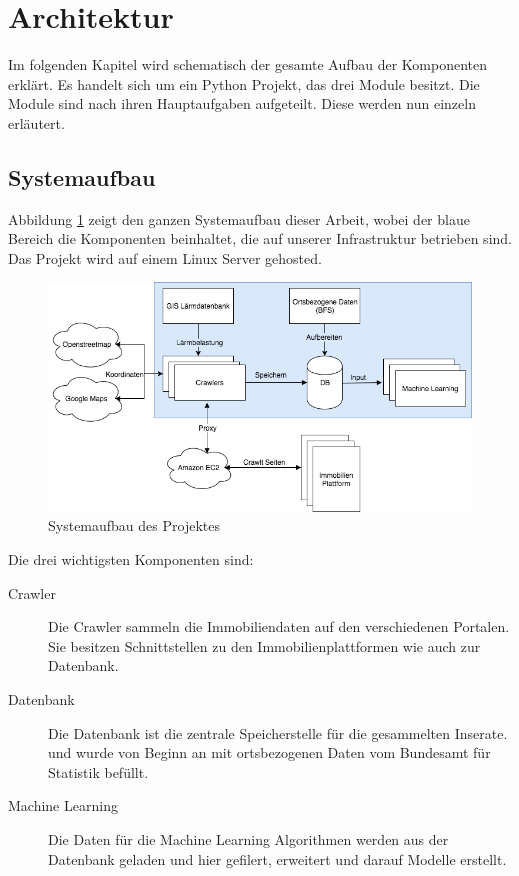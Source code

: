 \section{Architektur}
Im folgenden Kapitel wird schematisch der gesamte Aufbau der Komponenten erklärt. Es handelt sich um ein Python Projekt, das drei Module besitzt. Die Module sind nach ihren Hauptaufgaben aufgeteilt. Diese werden nun einzeln erläutert.

\subsection{Systemaufbau}
Abbildung \ref{fig:system} zeigt den ganzen Systemaufbau dieser Arbeit, wobei der blaue Bereich die Komponenten beinhaltet, die auf unserer Infrastruktur betrieben sind. Das Projekt wird auf einem Linux Server gehosted.

\begin{figure}[ht]
\centering
\includegraphics[width=\textwidth]{images/Architektur.png}
\caption[Systemaufbau des Projektes]{Systemaufbau des Projektes}%
\label{fig:system}
\end{figure}

Die drei wichtigsten Komponenten sind:
\begin{description}
\item[Crawler] Die Crawler sammeln die Immobiliendaten auf den verschiedenen Portalen. Sie besitzen Schnittstellen zu den Immobilienplattformen wie auch zur Datenbank.
\item[Datenbank] Die Datenbank ist die zentrale Speicherstelle für die gesammelten Inserate. und wurde von Beginn an mit ortsbezogenen Daten vom Bundesamt für Statistik befüllt.
\item[Machine Learning] Die Daten für die Machine Learning Algorithmen werden aus der Datenbank geladen und hier gefilert, erweitert und darauf Modelle erstellt.
\end{description}

